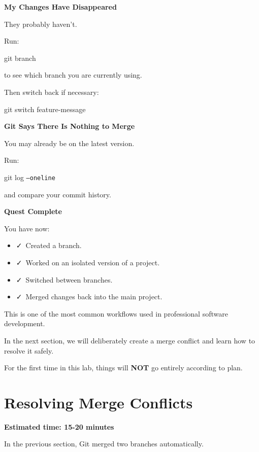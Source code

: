 \documentclass{csc2059practical}
\begin{document}
\begin{commonerror}
\textbf{My Changes Have Disappeared}\par
\medskip
They probably haven't.

Run:

\begin{terminalplain}
  git branch
\end{terminalplain}
to see which branch you are currently using.

Then switch back if necessary:

\begin{terminalplain}
  git switch feature-message
\end{terminalplain}
\end{commonerror}
\begin{commonerror}
\textbf{Git Says There Is Nothing to Merge}\par
\medskip
You may already be on the latest version.

Run:

\begin{terminalplain}
  git log \texttt{--oneline}
\end{terminalplain}
and compare your commit history.
\end{commonerror}

\begin{wrapupbox}
\textbf{Quest Complete}\par
\medskip
You have now:

\begin{itemize}
  \item \faCheck\ Created a branch.
  \item \faCheck\ Worked on an isolated version of a project.
  \item \faCheck\ Switched between branches.
  \item \faCheck\ Merged changes back into the main project.
\end{itemize}

This is one of the most common workflows used in professional software development.

In the next section, we will deliberately create a merge conflict and learn how to resolve it safely.

For the first time in this lab, things will \textbf{NOT} go entirely according to plan.
\end{wrapupbox}

\section{Resolving Merge Conflicts}
\begin{infobox}
\textbf{Estimated time: 15-20 minutes}
\end{infobox}
In the previous section, Git merged two branches automatically.
\end{document}
